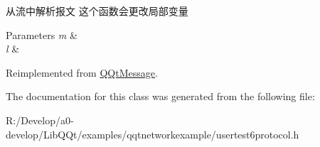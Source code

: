 从流中解析报文 这个函数会更改局部变量 


\begin{DoxyParams}{Parameters}
{\em m} & \\
\hline
{\em l} & \\
\hline
\end{DoxyParams}


Reimplemented from \mbox{\hyperlink{class_q_qt_message_a0bc25669bdd61490b1d8df6d77565f31}{Q\+Qt\+Message}}.



The documentation for this class was generated from the following file\+:\begin{DoxyCompactItemize}
\item 
R\+:/\+Develop/a0-\/develop/\+Lib\+Q\+Qt/examples/qqtnetworkexample/usertest6protocol.\+h\end{DoxyCompactItemize}
